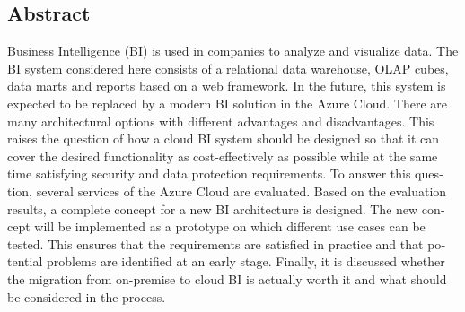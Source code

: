 

\begin{otherlanguage}{american}
	\chapter*{Abstract}
	Business Intelligence (BI) is used in companies to analyze and visualize data. The BI system considered here consists of a relational data warehouse, OLAP cubes, data marts and reports based on a web framework. In the future, this system is expected to be replaced by a modern BI solution in the Azure Cloud. There are many architectural options with different advantages and disadvantages. This raises the question of how a cloud BI system should be designed so that it can cover the desired functionality as cost-effectively as possible while at the same time satisfying security and data protection requirements. To answer this question, several services of the Azure Cloud are evaluated. Based on the evaluation results, a complete concept for a new BI architecture is designed. The new concept will be implemented as a prototype on which different use cases can be tested. This ensures that the requirements are satisfied in practice and that potential problems are identified at an early stage. Finally, it is discussed whether the migration from on-premise to cloud BI is actually worth it and what should be considered in the process.
\end{otherlanguage}